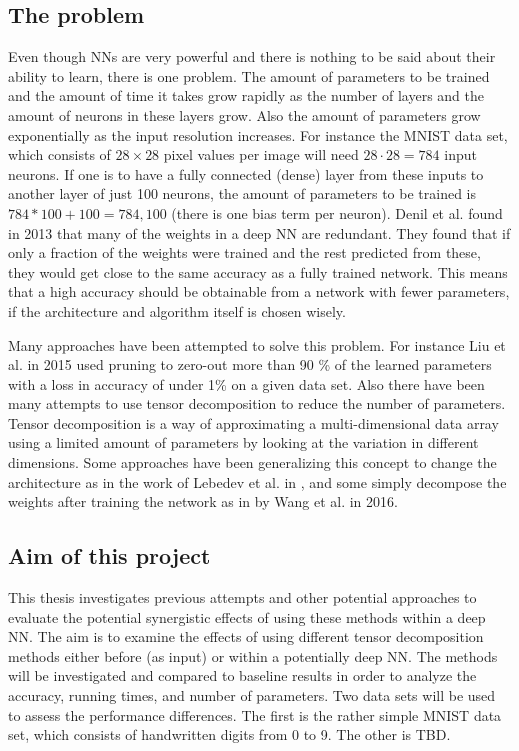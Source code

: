 \subsection{The problem}
Even though NNs are very powerful and there is nothing to be said about their ability to learn, there is one problem. The amount of parameters to be trained and the amount of time it takes grow rapidly as the number of layers and the amount of neurons in these layers grow. Also the amount of parameters grow exponentially as the input resolution increases. For instance the MNIST data set, which consists of $28\times28$ pixel values per image will need $28\cdot28 = 784$ input neurons. If one is to have a fully connected (dense) layer from these inputs to another layer of just 100 neurons, the amount of parameters to be trained is $784 * 100 + 100 = 784,100$ (there is one bias term per neuron). Denil et al. found in 2013 that many of the weights in a deep NN are redundant\cite{Denil2013}. They found that if only a fraction of the weights were trained and the rest predicted from these, they would get close to the same accuracy as a fully trained network. This means that a high accuracy should be obtainable from a network with fewer parameters, if the architecture and algorithm itself is chosen wisely.

Many approaches have been attempted to solve this problem. For instance Liu et al. in 2015 used pruning to zero-out more than 90 \% of the learned parameters with a loss in accuracy of under 1\% on a given data set. Also there have been many attempts to use tensor decomposition to reduce the number of parameters. Tensor decomposition is a way of approximating a multi-dimensional data array using a limited amount of parameters by looking at the variation in different dimensions. Some approaches have been generalizing this concept to change the architecture as in the work of Lebedev et al. in \cite{Lebedev2015}, and some simply decompose the weights after training the network as in \cite{Wang2016} by Wang et al. in 2016. 

\subsection{Aim of this project}
This thesis investigates previous attempts and other potential approaches to evaluate the potential synergistic effects of using these methods within a deep NN. The aim is to examine the effects of using different tensor decomposition methods either before (as input) or within a potentially deep NN. The methods will be investigated and compared to baseline results in order to analyze the accuracy, running times, and number of parameters. Two data sets will be used to assess the performance differences. The first is the rather simple MNIST data set\cite{MNIST}, which consists of handwritten digits from 0 to 9. The other is TBD. 